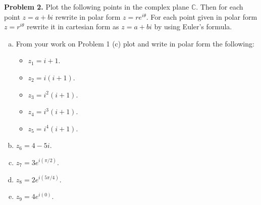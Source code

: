 \documentclass[12pt]{report} %
\newcommand{\C}{\mathbb{C}}
\theoremstyle{definition}
\begin{document}
\noindent\textbf{Problem 2.} Plot the following points in the complex plane $\C$.  Then for each point $z=a+bi$ rewrite in polar form $z=re^{i\theta}$. For each point given in polar form $z=r^{i\theta}$ rewrite it in cartesian form as $z=a+bi$ by using Euler's formula.
\begin{enumerate}[(a)]
    \item From your work on Problem 1 (c) plot and write in polar form the following:
    \begin{itemize}
        \item $z_1=i+1$.
        \item $z_2=i(i+1)$.
        \item $z_3=i^2(i+1)$.
        \item $z_4=i^3(i+1)$.
        \item $z_5=i^4(i+1)$.
    \end{itemize}
    \item $z_6=4-5i$.
    \item $z_7=3e^{i(\pi/2)}$.
    \item $z_8=2e^{i(5\pi/4)}$.
    \item $z_9=4e^{i(0)}$.
\end{enumerate}
\end{document}
